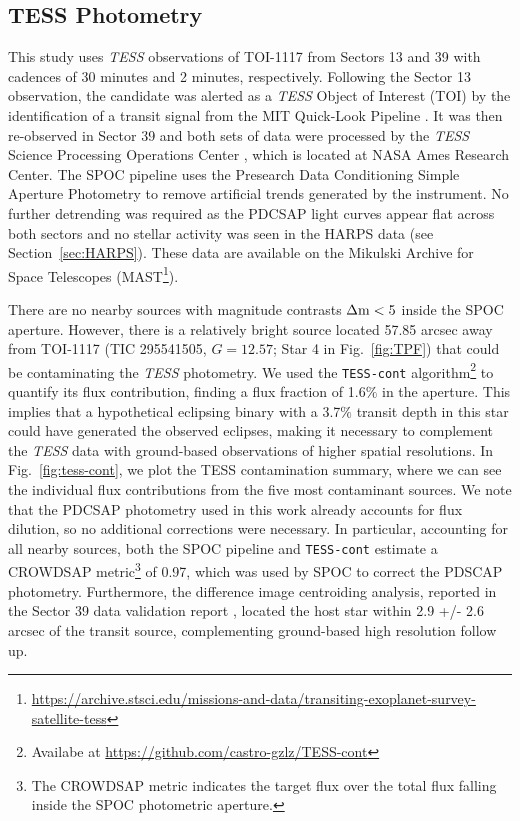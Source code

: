 \documentclass[fleqn,usenatbib,useAMS]{mnras}
\begin{document}
\subsection{TESS Photometry}
\label{sec:TESS}

This study uses \textit{TESS} observations of TOI-1117 from Sectors 13 and 39 with cadences of 30 minutes and 2 minutes, respectively. Following the Sector 13 observation, the candidate was alerted as a \textit{TESS} Object of Interest (TOI) by the identification of a transit signal from the MIT Quick-Look Pipeline \citep[QLP;][]{Huang_2020}. It was then re-observed in Sector 39 and both sets of data were processed by the \textit{TESS} Science Processing Operations Center \citep[SPOC;][]{2016SPIE.9913E..3EJ, TESSSPOC2020}, which is located at NASA Ames Research Center. The SPOC pipeline uses the Presearch Data Conditioning Simple Aperture Photometry \citep[PDCSAP;][]{Smith2012,Stumpe2012,Stumpe2014} to remove artificial trends generated by the instrument. No further detrending was required as the PDCSAP light curves appear flat across both sectors and no stellar activity was  seen in the HARPS data (see Section~\ref{sec:HARPS}). These data are available on the Mikulski Archive for Space Telescopes (MAST\footnote{\url{https://archive.stsci.edu/missions-and-data/transiting-exoplanet-survey-satellite-tess}}).

There are no nearby sources with magnitude contrasts $\rm \Delta m<5$ inside the SPOC aperture. However, there is a relatively bright source located 57.85 arcsec away from TOI-1117 (TIC 295541505, $G = 12.57$; Star 4 in Fig.~\ref{fig:TPF}) that could be contaminating the \textit{TESS} photometry. We used the \texttt{TESS-cont} algorithm\footnote{Availabe at \url{https://github.com/castro-gzlz/TESS-cont}} \citep{CastroGonzalez2024:TESS-cont} to quantify its flux contribution, finding a flux fraction of 1.6$\%$ in the aperture. This implies that a hypothetical eclipsing binary with a 3.7$\%$ transit depth in this star could have generated the observed eclipses, making it necessary to complement the \textit{TESS} data with ground-based observations of higher spatial resolutions. In Fig.~\ref{fig:tess-cont}, we plot the TESS contamination summary, where we can see the individual flux contributions from the five most contaminant sources. We note that the  PDCSAP photometry used in this work already accounts for flux dilution, so no additional corrections were necessary. In particular, accounting for all nearby sources, both the SPOC pipeline and \texttt{TESS-cont} estimate a CROWDSAP metric\footnote{The CROWDSAP metric indicates the target flux over the total flux falling inside the SPOC photometric aperture.} of 0.97, which was used by SPOC to correct the PDSCAP photometry. Furthermore, the difference image centroiding analysis, reported in the Sector 39 data validation report \citep{Twicken:DVdiagnostics2018}, located the host star within 2.9 +/- 2.6 arcsec of the transit source, complementing ground-based high resolution follow up. 
\end{document}
